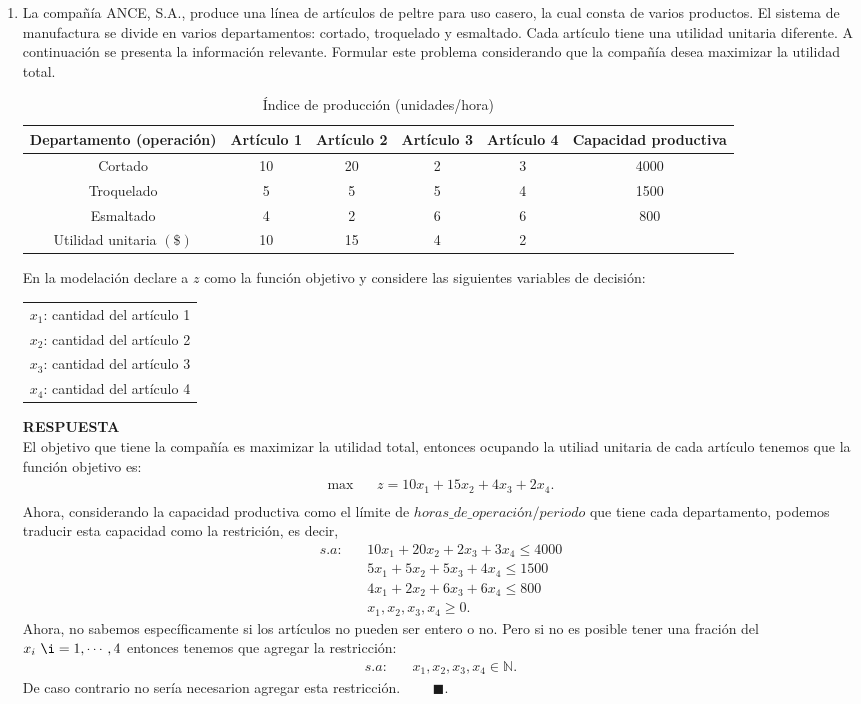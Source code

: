 \documentclass[11pt,letterpaper]{article}
\newcommand{\res}{\textbf{RESPUESTA}\\}
\newcommand{\fin}{$\blacksquare.$}
\begin{document}
\begin{enumerate}
\item La compañía ANCE, S.A., produce una línea de artículos de peltre para uso casero, la cual consta de varios productos. El sistema de manufactura se divide en varios departamentos: cortado, troquelado y esmaltado. Cada artículo tiene una utilidad unitaria diferente. A continuación se presenta la información relevante. Formular este problema considerando que la compañía desea maximizar la utilidad total.
\begin{table}[H]
\centering
\begin{tabular}{c|c|c|c|c|c}
Departamento (operación) & Artículo 1 & Artículo 2 & Artículo 3 & Artículo 4 & Capacidad productiva\\ \hline \hline 
Cortado & 10 & 20 & 2 & 3 & 4000\\
Troquelado & 5 & 5 & 5 & 4 & 1500\\
Esmaltado & 4 & 2 & 6 & 6 & 800\\
Utilidad unitaria $(\$)$ & 10 & 15 & 4 & 2&  \\ \hline \hline
\end{tabular}
\caption{Índice de producción (unidades/hora)}
\end{table}
En la modelación declare a $z$ como la función objetivo y considere las siguientes variables de decisión:
\begin{table}[H]
\begin{tabular}{c}
$x_1$: cantidad del artículo 1\\
$x_2$: cantidad del artículo 2\\
$x_3$: cantidad del artículo 3\\
$x_4$: cantidad del artículo 4
\end{tabular}
\end{table}

\res El objetivo que tiene la compañía es maximizar la utilidad total, entonces ocupando la utiliad unitaria de cada artículo tenemos que la función objetivo es:
\begin{align*}
\max\ \ \ \ & z=10x_1+15x_2+4x_3+2x_4.\\
\end{align*}
Ahora, considerando la capacidad productiva como el límite de $horas\_de\_operación/periodo$ que tiene cada departamento, podemos traducir esta capacidad como la restrición, es decir,
\begin{align*}
s.a:\ \ \ \ & 10x_1+20x_2 +2x_3+3x_4\leq 4000\\
	 & 5x_1+5x_2+5x_3+4x_4\leq 1500\\
	 & 4x_1+2x_2+6x_3+6x_4 \leq 800\\
	 & x_1,x_2,x_3,x_4 \geq 0. 
\end{align*}
Ahora, no sabemos específicamente si los artículos no pueden ser entero o no. Pero si no es posible tener una fración del $x_i \ \i=1,\cdots, 4$ entonces tenemos que agregar la restricción:
\begin{align*}
s.a:\ \ \ \ & x_1,x_2,x_3, x_4\in \mathbb{N}.
\end{align*}
De caso contrario no sería necesarion agregar esta restricción. \ \ \ \ \fin


\end{enumerate}
\end{document}
